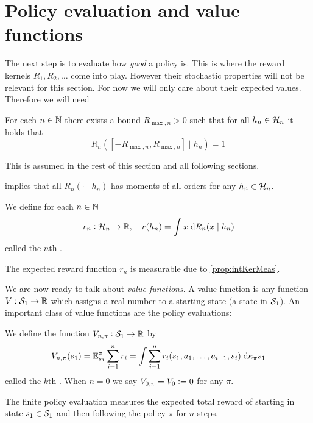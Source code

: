 \section{Policy evaluation and value functions}
The next step is to evaluate how \emph{good} a policy is.
This is where the reward kernels $R_1, R_2, \dots$ come into play.
However their stochastic properties will not be
relevant for this section. For now we will
only care about their expected values. Therefore we will need
\begin{asm}
  For each $n \in \mathbb{N}$ there exists a bound $R_{\max, n} > 0$
  such that for all $h_n \in \mathcal{H}_n$ it holds that
  \[ R_n([-R_{\max, n}, R_{\max, n}] \mid h_n) = 1 \]
  \label{asm:finRewBound}
\end{asm}
This is assumed in the rest of this section and all following sections.
\begin{rem}
   implies that all $R_n(\cdot \mid h_n)$ has moments of
  all orders for any $h_n \in \mathcal{H}_n$.
  \label{rem:expRewMeas}
\end{rem}
\begin{defn}
  We define for each $n \in \mathbb{N}$
  \[ r_n : \mathcal{H}_n \to \mathbb{R}, \quad r(h_n) = \int x \; \mathrm{d} R_n(x \mid h_n) \]
  called the $n$th .
  \label{defn:expRewFunc}
\end{defn}
\begin{rem}
  The expected reward function $r_n$ is measurable due to
  \cref{prop:intKerMeas}.
\end{rem}

We are now ready to talk about \emph{value functions}.
A value function is any function $V: \mathcal{S}_1 \to \mathbb{R}$
which assigns a real number to a starting state (a state in $\mathcal{S}_1$).
An important class of value functions are the
policy evaluations:

\begin{defn}
  We define the function $V_{n, \pi} : \mathcal{S}_1 \to \mathbb{R}$ by
  \[ V_{n,\pi}(s_1) = \mathbb{E}_{s_1}^\pi \sum_{i=1}^n r_i
    = \int \sum_{i=1}^n r_i(s_1, a_1, \dots, a_{i-1}, s_i)
  \; \mathrm{d} \kappa_\pi s_1 \]
  called the $k$th .
  When $n=0$ we say $V_{0,\pi} = V_0 \vcentcolon= 0$ for any $\pi$.
\end{defn}
The finite policy evaluation
measures the expected total reward of starting in state $s_1 \in \mathcal{S}_1$
and then following the policy $\pi$ for $n$ steps.

